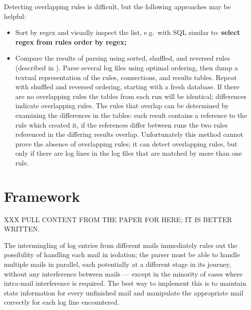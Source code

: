 Detecting overlapping rules is difficult, but the following approaches may
be helpful:

\begin{itemize}

    \item Sort by regex and visually inspect the list, e.g.\ with \gls{SQL}
        similar to: \textbf{select regex from rules order by regex;}

    \item Compare the results of parsing using sorted, shuffled, and
        reversed rules (described in ).  Parse several log files using optimal ordering, then
        dump a textual representation of the rules, connections, and
        results tables.  Repeat with shuffled and reversed ordering,
        starting with a fresh database.  If there are no overlapping rules
        the tables from each run will be identical; differences indicate
        overlapping rules.  The rules that overlap can be determined by
        examining the differences in the tables: each result contains a
        reference to the rule which created it, if the references differ
        between runs the two rules referenced in the differing results
        overlap.  Unfortunately this method cannot prove the absence of
        overlapping rules; it can detect overlapping rules, but only if
        there are log lines in the log files that are matched by more than
        one rule.

\end{itemize}


\section{Framework}

XXX PULL CONTENT FROM THE PAPER FOR HERE\@; IT IS BETTER WRITTEN\@.

\label{framework}

The intermingling of log entries from different mails immediately rules out
the possibility of handling each mail in isolation; the parser must be able
to handle multiple mails in parallel, each potentially at a different stage
in its journey, without any interference between mails --- except in the
minority of cases where intra-mail interference is required.  The best way
to implement this is to maintain state information for every unfinished
mail and manipulate the appropriate mail correctly for each log line
encountered.

